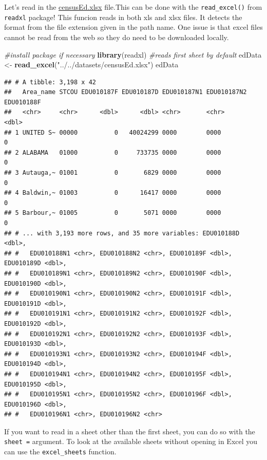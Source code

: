 \documentclass[
]{book}
\newenvironment{Shaded}{\begin{snugshade}}{\end{snugshade}}
\newcommand{\CommentTok}[1]{\textcolor[rgb]{0.56,0.35,0.01}{\textit{#1}}}
\newcommand{\KeywordTok}[1]{\textcolor[rgb]{0.13,0.29,0.53}{\textbf{#1}}}
\newcommand{\NormalTok}[1]{#1}
\newcommand{\StringTok}[1]{\textcolor[rgb]{0.31,0.60,0.02}{#1}}
\theoremstyle{definition}
\theoremstyle{definition}
\theoremstyle{definition}
\theoremstyle{remark}
\begin{document}
Let's read in the \href{https://www4.stat.ncsu.edu/~online/datasets/censusEd.xlsx}{censusEd.xlsx} file.This can be done with the \texttt{read\_excel()} from \texttt{readxl} package! This funcion reads in both xls and xlsx files. It detects the format from the file extension given in the path name. One issue is that excel files cannot be read from the web so they do need to be downloaded locally.

\begin{Shaded}
\begin{Highlighting}[]
\CommentTok{#install package if necessary}
\KeywordTok{library}\NormalTok{(readxl)}
\CommentTok{#reads first sheet by default}
\NormalTok{edData <-}\StringTok{ }\KeywordTok{read_excel}\NormalTok{(}\StringTok{"../../datasets/censusEd.xlsx"}\NormalTok{)}
\NormalTok{edData}
\end{Highlighting}
\end{Shaded}

\begin{verbatim}
## # A tibble: 3,198 x 42
##   Area_name STCOU EDU010187F EDU010187D EDU010187N1 EDU010187N2 EDU010188F
##   <chr>     <chr>      <dbl>      <dbl> <chr>       <chr>            <dbl>
## 1 UNITED S~ 00000          0   40024299 0000        0000                 0
## 2 ALABAMA   01000          0     733735 0000        0000                 0
## 3 Autauga,~ 01001          0       6829 0000        0000                 0
## 4 Baldwin,~ 01003          0      16417 0000        0000                 0
## 5 Barbour,~ 01005          0       5071 0000        0000                 0
## # ... with 3,193 more rows, and 35 more variables: EDU010188D <dbl>,
## #   EDU010188N1 <chr>, EDU010188N2 <chr>, EDU010189F <dbl>, EDU010189D <dbl>,
## #   EDU010189N1 <chr>, EDU010189N2 <chr>, EDU010190F <dbl>, EDU010190D <dbl>,
## #   EDU010190N1 <chr>, EDU010190N2 <chr>, EDU010191F <dbl>, EDU010191D <dbl>,
## #   EDU010191N1 <chr>, EDU010191N2 <chr>, EDU010192F <dbl>, EDU010192D <dbl>,
## #   EDU010192N1 <chr>, EDU010192N2 <chr>, EDU010193F <dbl>, EDU010193D <dbl>,
## #   EDU010193N1 <chr>, EDU010193N2 <chr>, EDU010194F <dbl>, EDU010194D <dbl>,
## #   EDU010194N1 <chr>, EDU010194N2 <chr>, EDU010195F <dbl>, EDU010195D <dbl>,
## #   EDU010195N1 <chr>, EDU010195N2 <chr>, EDU010196F <dbl>, EDU010196D <dbl>,
## #   EDU010196N1 <chr>, EDU010196N2 <chr>
\end{verbatim}

If you want to read in a sheet other than the first sheet, you can do so with the \texttt{sheet\ =} argument. To look at the available sheets without opening in Excel you can use the \texttt{excel\_sheets} function.
\end{document}

